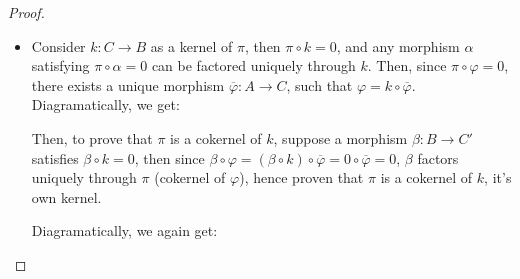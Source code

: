 \documentclass[x11names,reqno,12pt]{extarticle}
\begin{document}
\begin{proof}
\begin{itemize}
        \item Consider $k:C\rightarrow B$ as a kernel of $\pi$, then $\pi\circ k=0$, and any morphism $\alpha$ satisfying $\pi\circ\alpha=0$ can be factored uniquely through $k$. Then, since $\pi\circ\varphi = 0$, there exists a unique morphism $\overline{\varphi}:A\rightarrow C$, such that $\varphi=k\circ \overline{\varphi}$. Diagramatically, we get:
        \begin{center}
        \end{center}
        Then, to prove that $\pi$ is a cokernel of $k$, suppose a morphism $\beta:B\rightarrow C'$ satisfies $\beta\circ k=0$, then since $\beta\circ\varphi = (\beta \circ k)\circ \overline{\varphi}=0\circ\overline{\varphi}=0$, $\beta$ factors uniquely through $\pi$ (cokernel of $\varphi$), hence proven that $\pi$ is a cokernel of $k$, it's own kernel.

        Diagramatically, we again get:
         \begin{center}
        \end{center}
    \end{itemize}
\end{proof}
\end{document}
